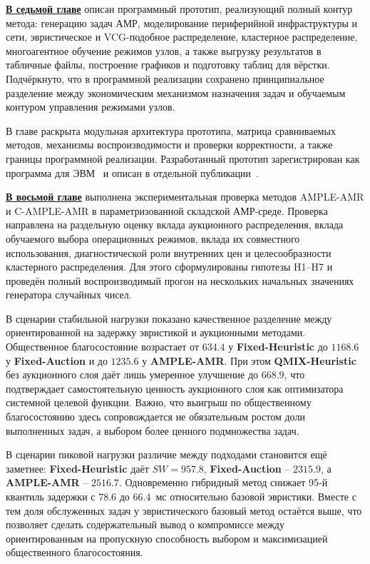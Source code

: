\underline{\textbf{В седьмой главе}} описан программный прототип,
реализующий полный контур метода: генерацию задач АМР, моделирование
периферийной инфраструктуры и сети, эвристическое и VCG-подобное
распределение, кластерное распределение, многоагентное обучение режимов
узлов, а также выгрузку результатов в табличные файлы, построение графиков и подготовку таблиц для вёрстки.
Подчёркнуто, что в программной реализации сохранено принципиальное разделение
между экономическим механизмом назначения задач и обучаемым контуром
управления режимами узлов.

В главе раскрыта модульная архитектура прототипа, матрица сравниваемых методов,
механизмы воспроизводимости и проверки корректности, а также границы
программной реализации. Разработанный прототип зарегистрирован как программа
для ЭВМ~\cite{patent_ma_vcg} и описан в отдельной публикации~\cite{Tereschenko2026AMPLEAMRPrototype}.

\underline{\textbf{В восьмой главе}} выполнена экспериментальная проверка
методов AMPLE-AMR и C-AMPLE-AMR в параметризованной складской АМР-среде.
Проверка направлена на раздельную оценку вклада аукционного распределения,
вклада обучаемого выбора операционных режимов, вклада их совместного
использования, диагностической роли внутренних цен и целесообразности
кластерного распределения. Для этого сформулированы гипотезы H1--H7 и проведён
полный воспроизводимый прогон на нескольких начальных значениях генератора
случайных чисел.

В сценарии стабильной нагрузки показано качественное разделение между
ориентированной на задержку эвристикой и аукционными методами. Общественное
благосостояние возрастает от $634.4$ у \textbf{Fixed-Heuristic} до $1168.6$ у
\textbf{Fixed-Auction} и до $1235.6$ у \textbf{AMPLE-AMR}. При этом
\textbf{QMIX-Heuristic} без аукционного слоя даёт лишь умеренное улучшение до
$668.9$, что подтверждает самостоятельную ценность аукционного слоя как
оптимизатора системной целевой функции. Важно, что выигрыш по общественному
благосостоянию здесь сопровождается не обязательным ростом доли выполненных задач, а
выбором более ценного подмножества задач.

В сценарии пиковой нагрузки различие между подходами становится ещё заметнее:
\textbf{Fixed-Heuristic} даёт $SW=957.8$, \textbf{Fixed-Auction} --
$2315.9$, а \textbf{AMPLE-AMR} -- $2516.7$. Одновременно гибридный метод
снижает 95-й квантиль задержки с $78.6$ до $66.4$~мс относительно базовой
эвристики. Вместе с тем доля обслуженных задач у эвристического базовый метод
остаётся выше, что позволяет сделать содержательный вывод о компромиссе между
ориентированным на пропускную способность выбором и максимизацией общественного
благосостояния.

